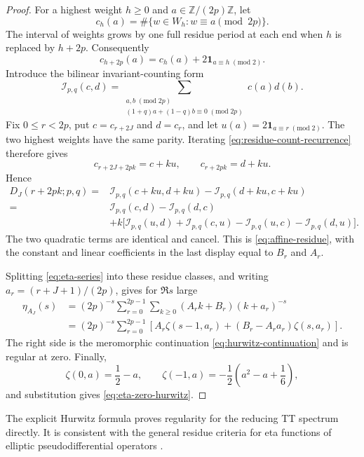 \documentclass[11pt]{article}
\theoremstyle{definition}
\newcommand{\Z}{\mathbb Z}
\newcommand{\ind}{\mathbf 1}
\begin{document}
\begin{proof}
For a highest weight $h\geq0$ and $a\in\Z/(2p)\Z$, let
\[
 c_h(a)=\#\{w\in W_h:w\equiv a\pmod{2p}\}.
\]
The interval of weights grows by one full residue period at each end when
$h$ is replaced by $h+2p$.  Consequently
\begin{equation}
 c_{h+2p}(a)=c_h(a)+
 2\ind_{a\equiv h\;(\mathrm{mod}\;2)}.
 \label{eq:residue-count-recurrence}
\end{equation}
Introduce the bilinear invariant-counting form
\[
 \mathcal I_{p,q}(c,d)=
 \sum_{\substack{a,b\;(\mathrm{mod}\;2p)\\
 (1+q)a+(1-q)b\equiv0\;(\mathrm{mod}\;2p)}}
 c(a)d(b).
\]
Fix $0\leq r<2p$, put $c=c_{r+2J}$ and $d=c_r$, and let
$u(a)=2\ind_{a\equiv r\;(\mathrm{mod}\;2)}$.  The two highest weights have
the same parity.  Iterating \eqref{eq:residue-count-recurrence} therefore
gives
\[
 c_{r+2J+2pk}=c+ku,\qquad c_{r+2pk}=d+ku.
\]
Hence
\begin{align*}
 D_J(r+2pk;p,q)
={}&\mathcal I_{p,q}(c+ku,d+ku)
   -\mathcal I_{p,q}(d+ku,c+ku)\\
={}&\mathcal I_{p,q}(c,d)-\mathcal I_{p,q}(d,c)\\
&+k\bigl[
 \mathcal I_{p,q}(u,d)+\mathcal I_{p,q}(c,u)
 -\mathcal I_{p,q}(u,c)-\mathcal I_{p,q}(d,u)
 \bigr].
\end{align*}
The two quadratic terms are identical and cancel.  This is
\eqref{eq:affine-residue}, with the constant and linear coefficients in the
last display equal to $B_r$ and $A_r$.

Splitting \eqref{eq:eta-series} into these residue classes, and writing
$a_r=(r+J+1)/(2p)$, gives for $\Re s$ large
\begin{align*}
 \eta_{A_J}(s)
 &=(2p)^{-s}\sum_{r=0}^{2p-1}
   \sum_{k\geq0}(A_rk+B_r)(k+a_r)^{-s}\\
 &=(2p)^{-s}\sum_{r=0}^{2p-1}
 \left[A_r\zeta(s-1,a_r)+(B_r-A_ra_r)\zeta(s,a_r)\right].
\end{align*}
The right side is the meromorphic continuation
\eqref{eq:hurwitz-continuation} and is regular at zero.  Finally,
\[
 \zeta(0,a)=\frac12-a,\qquad
 \zeta(-1,a)=-\frac12\left(a^2-a+\frac16\right),
\]
and substitution gives \eqref{eq:eta-zero-hurwitz}.
\end{proof}

The explicit Hurwitz formula proves regularity for the reducing TT spectrum
directly.  It is consistent with the general residue criteria for eta
functions of elliptic pseudodifferential operators
\cite{Ponge2003,SeilerStrohmaier2010}.
\end{document}
